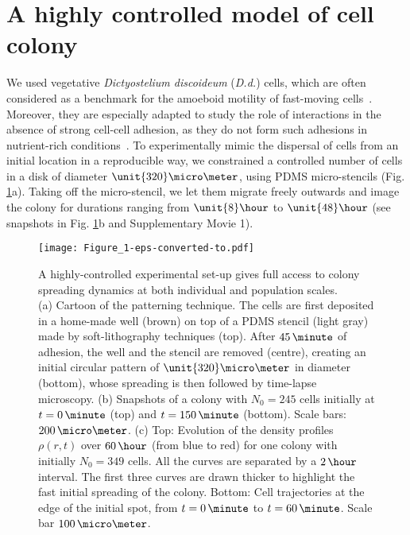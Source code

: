 \documentclass[11pt, twocolumn]{article}
\begin{document}
\section*{A highly controlled model of cell colony}

We used vegetative
{\it Dictyostelium discoideum} (\textit{D.d.}) cells, which are often considered
as a benchmark for the amoeboid motility of fast-moving cells~\cite{Friedl2001,Friedl2010,Levine2014}.
Moreover, they are especially adapted to study the role of interactions
in the absence of strong cell-cell adhesion, as they do not
form such adhesions in nutrient-rich conditions~\cite{Coates2001}.
To experimentally mimic the dispersal of cells from an initial
location in a reproducible way, we constrained a controlled
number of cells in a disk of diameter $\unit{320}\micro\meter$,
using PDMS micro-stencils
\cite{Poujade2007,Serra2012} (Fig. \ref{fig:set-up}a).  Taking off the
micro-stencil, we let them migrate freely outwards and image the
colony for durations ranging from $\unit{8}\hour$ to $\unit{48}\hour$
(see snapshots in Fig. \ref{fig:set-up}b and Supplementary Movie 1).

\begin{figure*}[ht!]

\centering
\texttt{[image: Figure\_1-eps-converted-to.pdf]}

\caption{A highly-controlled experimental set-up gives full access to colony spreading dynamics at both individual and population scales.\\
  (a) Cartoon of the patterning technique. The cells are first
  deposited in a home-made well (brown) on top of a PDMS stencil
  (light gray) made by soft-lithography techniques (top). After
  $45\,\minute$ of adhesion, the well and the stencil are removed
  (centre), creating an initial circular pattern of
  $\unit{320}\micro\meter$ in diameter (bottom), whose spreading is
  then followed by time-lapse microscopy.  (b) Snapshots of a colony
  with $N_0=245$ cells initially at $t=0\,\minute$ (top) and
  $t=150\,\minute$ (bottom). Scale bars: $200\,\micro\meter$.  (c)
  Top: Evolution of the density profiles $\rho(r, t)$ over $60\,\hour$
  (from blue to red) for one colony with initially $N_0=349$
  cells. All the curves are separated by a $2\,\hour$ interval. The
  first three curves are drawn thicker to highlight the fast initial
  spreading of the colony.  Bottom: Cell trajectories at the edge of
  the initial spot, from $t=0\,\minute$ to $t=60\,\minute$. Scale bar
  $100\,\micro\meter$.}
\label{fig:set-up}
\end{figure*}
\end{document}
